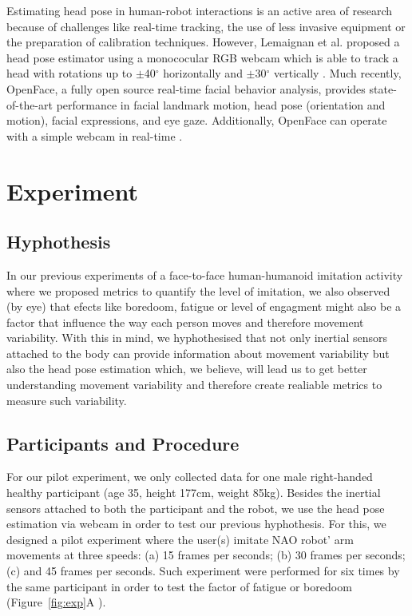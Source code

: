 Estimating head pose in human-robot interactions is an active area of research
because of challenges like real-time tracking, the use of less invasive equipment
or the preparation of calibration techniques. However, Lemaignan et al. proposed a head pose estimator
using a monococular RGB webcam which is able to track a head with rotations up
to $\pm$40$^{\circ}$ horizontally and $\pm$30$^{\circ}$ vertically \cite{Lemaignan2016}.
Much recently, OpenFace, a fully open source real-time facial behavior analysis,
provides state-of-the-art performance in facial landmark motion,
head pose (orientation and motion), facial expressions, and eye gaze.
Additionally, OpenFace can operate with a simple webcam in real-time
\cite{Baltrusaitis2016}.



\section{Experiment}


\subsection{Hyphothesis}
In our previous experiments of a face-to-face human-humanoid imitation
activity \cite{XXX2017} where we proposed metrics to quantify the level of
imitation, we also observed (by eye) that efects like boredoom, fatigue or
level of engagment might also be a factor that influence
the way each person moves and therefore movement variability.
With this in mind, we hyphothesised that not only inertial sensors attached
to the body can provide information about movement variability
but also the head pose estimation which, we believe, will lead us to get better
understanding movement variability and therefore create
realiable metrics to measure such variability.


\subsection{Participants and Procedure}
For our pilot experiment, we only collected data for one male right-handed healthy
participant  (age 35, height 177cm, weight 85kg).
Besides the inertial sensors attached to both the participant and the robot,
we use the head pose estimation via webcam in order to test our previous hyphothesis.
For this, we designed a pilot experiment where the user(s) imitate NAO robot' arm
movements at three speeds:
(a) 15 frames per seconds;
(b) 30 frames per seconds;
(c) and 45 frames per seconds.
Such experiment were performed for six times by the same participant
in order to test the factor of fatigue or boredoom (Figure~\ref{fig:exp}A ).

